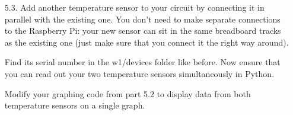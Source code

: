 \begin{enumerate}

%



\item[5.3.]	Add another temperature sensor to your circuit by connecting it in parallel with the existing one. 
You don't need to make separate connections to the Raspberry Pi: your new sensor can sit in the same breadboard tracks as the existing one (just make sure that you connect it the right way around).

Find its serial number in the w1/devices folder like before.
Now ensure that you can read out your two temperature sensors simultaneously in Python.

%

%
%


%


Modify your graphing code from part 5.2 to display data from both temperature sensors on a single graph.


\end{enumerate}


